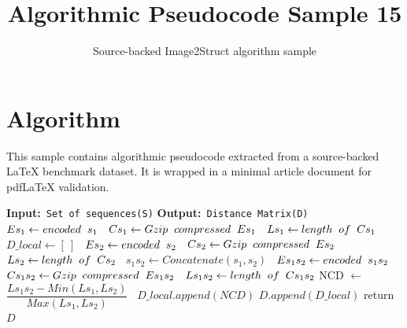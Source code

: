 \documentclass[11pt]{article}
\title{Algorithmic Pseudocode Sample 15}
\author{Source-backed Image2Struct algorithm sample}
\date{}
\begin{document}
\maketitle
\section{Algorithm}
This sample contains algorithmic pseudocode extracted from a source-backed LaTeX benchmark dataset. It is wrapped in a minimal article document for pdfLaTeX validation.

\begin{algorithm}[htbp]
\caption{Source-backed algorithmic procedure}
\begin{algorithm}
[h!]
\caption{Distance matrix computation with Gzip}
\scriptsize
\begin{algorithmic}[1]
\Statex \textbf{Input:}\texttt{ Set of sequences(S)}
\Statex \textbf{Output:}\texttt{ Distance Matrix(D)}
\State \texttt{ $Es_{1} \gets encoded \hspace{0.2cm} s_{1}$}
\State \texttt{ $Cs_{1} \gets Gzip\hspace{0.2cm} compressed \hspace{0.2cm} Es_{1}$}
\State \texttt{ $Ls_{1} \gets length \hspace{0.2cm} of \hspace{0.2cm} Cs_{1}$}
\State \texttt{ $D \_ local \gets [\ ]$}
\State \texttt{ $Es_{2} \gets encoded \hspace{0.2cm} s_{2}$}
\State \texttt{ $Cs_{2} \gets Gzip \hspace{0.2cm} compressed \hspace{0.2cm} Es_{2}$}
\State \texttt{ $Ls_{2} \gets length \hspace{0.2cm} of \hspace{0.2cm} Cs_{2}$}
\State \texttt{ $s_{1}s_{2} \gets Concatenate(s_{1},s_{2})$}
\State \texttt{ $Es_{1}s_{2} \gets encoded \hspace{0.2cm} s_{1}s_{2}$}
\State \texttt{ $Cs_{1}s_{2} \gets Gzip \hspace{0.2cm} compressed \hspace{0.2cm} Es_{1}s_{2}$}
\State \texttt{ $Ls_{1}s_{2} \gets length \hspace{0.2cm} of \hspace{0.2cm} Cs_{1}s_{2}$}
\State NCD $\gets$ $\dfrac{L s_1 s_2 - Min (Ls_1, Ls_2)}{Max(Ls_1, Ls_2)}$
\State \texttt{ $D\_local.append(NCD)$}
\EndFor
\State $D.append(D\_local)$
\EndFor
\State return $D$
\end{algorithmic}
\end{algorithm}
\end{algorithm}
\end{document}
